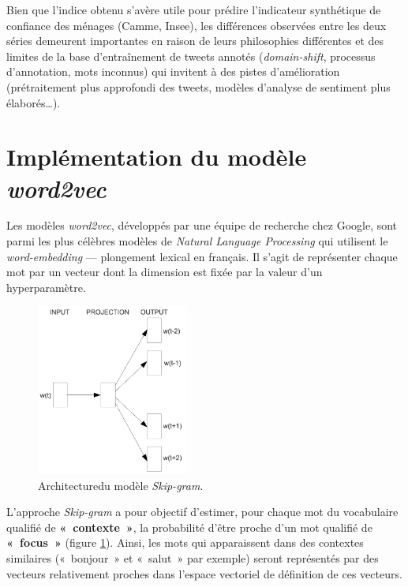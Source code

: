 \documentclass[10pt,french,french]{article}
\begin{document}
\begin{figure}[htb]

\end{figure}

Bien que l'indice obtenu s'avère utile pour prédire l'indicateur synthétique de confiance des ménages (Camme, Insee), les différences observées entre les deux séries demeurent importantes en raison de leurs philosophies différentes et des limites de la base d'entraînement de tweets annotés (\emph{domain-shift}, processus d'annotation, mots inconnus) qui invitent à des pistes d'amélioration (prétraitement plus approfondi des tweets, modèles d'analyse de sentiment plus élaborés\dots).

\newpage

\hypertarget{sec:word2vec}{%
\section{\texorpdfstring{Implémentation du modèle \emph{word2vec}}{Implémentation du modèle word2vec}}\label{sec:word2vec}}

Les modèles \emph{word2vec}, développés par une équipe de recherche chez Google, sont parmi les plus célèbres modèles de \emph{Natural Language Processing} qui utilisent le \emph{word-embedding} --- plongement lexical en français.
Il s'agit de représenter chaque mot par un vecteur dont la dimension est fixée par la valeur d'un hyperparamètre.

\begin{figure}
\includegraphics[width=5cm]{img/skip_gram.png}
\captionsetup{margin=0cm,format=hang,justification=justified}
\caption{Architecture\newline du modèle \emph{Skip-gram}.}\label{fig:skipgram}
\end{figure}

L'approche \emph{Skip-gram} a pour objectif d'estimer, pour chaque mot du vocabulaire qualifié de \textbf{«~contexte~»}, la probabilité d'être proche d'un mot qualifié de \textbf{«~focus~»} (figure \ref{fig:skipgram}).
Ainsi, les mots qui apparaissent dans des contextes similaires («~bonjour~» et «~salut~» par exemple) seront représentés par des vecteurs relativement proches dans l'espace vectoriel de définition de ces vecteurs.
\end{document}
